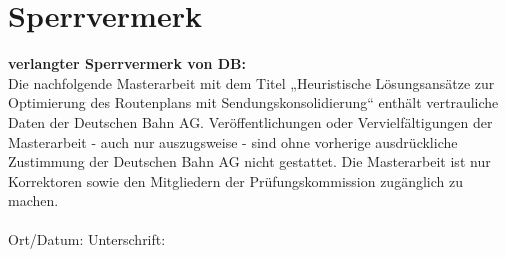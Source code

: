 \section*{\centering Sperrvermerk}

\noindent\textbf{verlangter Sperrvermerk von DB:}\\
Die nachfolgende Masterarbeit mit dem Titel „Heuristische Lösungsansätze zur Optimierung des Routenplans mit Sendungskonsolidierung“  enthält vertrauliche Daten der Deutschen Bahn AG. Veröffentlichungen oder Vervielfältigungen der Masterarbeit - auch nur auszugsweise - sind ohne vorherige ausdrückliche Zustimmung der Deutschen Bahn AG nicht gestattet. Die Masterarbeit ist nur Korrektoren sowie den Mitgliedern der Prüfungskommission zugänglich zu machen. \\
\\
Ort/Datum: \hrulefill\quad Unterschrift: \hrulefill\\

